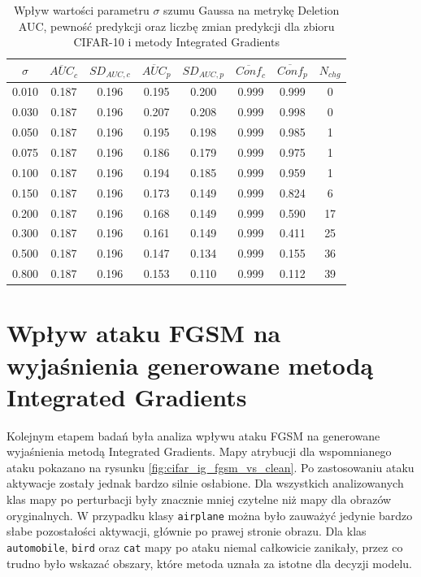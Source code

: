 \begin{table}[H] \centering \caption{Wpływ wartości parametru \(\sigma\) szumu Gaussa na metrykę Deletion AUC, pewność predykcji oraz liczbę zmian predykcji dla zbioru CIFAR-10 i metody Integrated Gradients} \label{tab:ig_sg_auc_conf_cifar10} \begin{tabular}{cccccccc} \toprule $\sigma$ & $\overline{AUC}_{c}$ & $SD_{AUC,c}$ & $\overline{AUC}_{p}$ & $SD_{AUC,p}$ & $\overline{Conf}_{c}$ & $\overline{Conf}_{p}$ & $N_{chg}$ \\ \midrule 0.010 & 0.187 & 0.196 & 0.195 & 0.200 & 0.999 & 0.999 & 0 \\ 0.030 & 0.187 & 0.196 & 0.207 & 0.208 & 0.999 & 0.998 & 0 \\ 0.050 & 0.187 & 0.196 & 0.195 & 0.198 & 0.999 & 0.985 & 1 \\ 0.075 & 0.187 & 0.196 & 0.186 & 0.179 & 0.999 & 0.975 & 1 \\ 0.100 & 0.187 & 0.196 & 0.194 & 0.185 & 0.999 & 0.959 & 1 \\ 0.150 & 0.187 & 0.196 & 0.173 & 0.149 & 0.999 & 0.824 & 6 \\ 0.200 & 0.187 & 0.196 & 0.168 & 0.149 & 0.999 & 0.590 & 17 \\ 0.300 & 0.187 & 0.196 & 0.161 & 0.149 & 0.999 & 0.411 & 25 \\ 0.500 & 0.187 & 0.196 & 0.147 & 0.134 & 0.999 & 0.155 & 36 \\ 0.800 & 0.187 & 0.196 & 0.153 & 0.110 & 0.999 & 0.112 & 39 \\ \bottomrule \end{tabular} \end{table}

\section{Wpływ ataku FGSM na wyjaśnienia generowane metodą Integrated Gradients}
\label{sec:ig_vs_fgsm_cifar}

Kolejnym etapem badań była analiza wpływu ataku FGSM na generowane wyjaśnienia metodą Integrated Gradients. Mapy atrybucji dla wspomnianego ataku pokazano na rysunku \ref{fig:cifar_ig_fgsm_vs_clean}. Po zastosowaniu ataku aktywacje zostały jednak bardzo silnie osłabione. Dla wszystkich analizowanych klas mapy po perturbacji były znacznie mniej czytelne niż mapy dla obrazów oryginalnych. W przypadku klasy \texttt{airplane} można było zauważyć jedynie bardzo słabe pozostałości aktywacji, głównie po prawej stronie obrazu. Dla klas \texttt{automobile}, \texttt{bird} oraz \texttt{cat} mapy po ataku niemal całkowicie zanikały, przez co trudno było wskazać obszary, które metoda uznała za istotne dla decyzji modelu.

